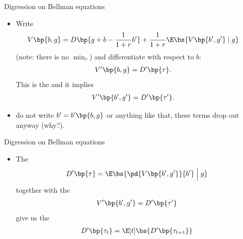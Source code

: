 \documentclass[11pt,xcolor={dvipsnames},hyperref={pdftex,pdfpagemode=UseNone,hidelinks,pdfdisplaydoctitle=true},usepdftitle=false]{beamer}
\begin{document}
    \begin{frame}{Digression on Bellman equations}
    \begin{itemize}
    \item Write
    \begin{align*}
    V\bp{b,g} & = D\bp{g+b-\frac{1}{1+r}b'}+\frac{1}{1+r}\E\bs{V\bp{b',g'}\mid g}
    \end{align*}
    (note: there is no $\min_{\tau}$) and differentiate with respect to $b$: 
    \begin{align*}
    V'\bp{b,g} & =D'\bp{\tau}.
    \end{align*}
    This is the  and it implies
    \begin{align*}
    V'\bp{b',g'} & =D'\bp{\tau'}.
    \end{align*}
    \item {} do not write $b'=b'\bp{b,g}$ or anything like
    that, these terms drop out anyway (why?).
    \end{itemize}
    \end{frame}
    \begin{frame}{Digression on Bellman equations}
    \begin{itemize}
    \item The  
    \[
        D'\bp{\tau}=\E\bs{\pd{V\bp{b',g'}}{b'} \mathrel{\Big|} g}  
    \]
    together with the 
    \begin{align*}
        V'\bp{b',g'}  =D'\bp{\tau'}
    \end{align*}
    give us the  
    \begin{align*}
        D'\bp{\tau_t}  =\E[t]\bs{D'\bp{\tau_{t+1}}}
    \end{align*}
    \end{itemize}
    \end{frame}
\end{document}
